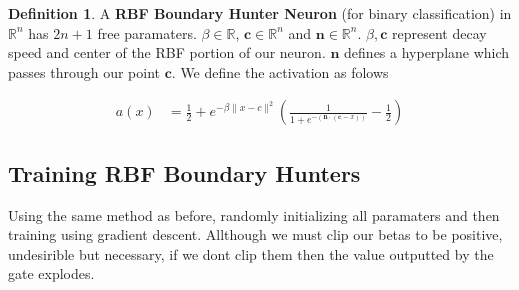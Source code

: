 \documentclass{article}
\theoremstyle{definition}
\newtheorem{definition}{Definition}[section]
\begin{document}
\theoremstyle{definition}
\begin{definition}
A \textbf{RBF Boundary Hunter Neuron} (for binary classification) in $\mathbb{R}^n$ has $2n + 1$ free paramaters. $\beta \in \mathbb{R}$, $\mathbf{c} \in \mathbb{R}^n$ and $\mathbf{n} \in \mathbb{R}^n$. $\beta, \mathbf{c}$ represent decay speed and center of the RBF portion of our neuron. $\mathbf{n}$ defines a hyperplane which passes through our point $\mathbf{c}$. We define the activation as folows

\begin{align}
a(x) &= \frac{1}{2} + e^{-\beta \lVert x - c \lVert^2}(\frac{1}{1 + e^{-(\mathbf{n} \cdot (\mathbf{c} - x))}} - \frac{1}{2})
\end{align}

\end{definition}

\subsection{Training RBF Boundary Hunters}
Using the same method as before, randomly initializing all paramaters and then training using gradient descent. Allthough we must clip our betas to be positive, undesirible but necessary, if we dont clip them then the value outputted by the gate explodes.
\end{document}
